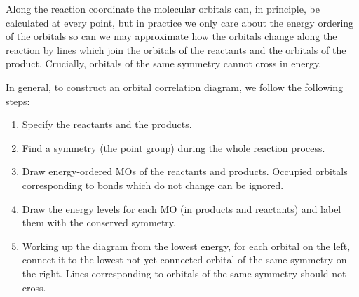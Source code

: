 \documentclass{article}
\theoremstyle{plain}\theoremheaderfont{\normalfont\itshape}\theorembodyfont{\rmfamily}\theoremseparator{.}\newtheorem*{rem}{Remark}\newtheorem*{ex}{Example}\newtheorem*{proof}{Proof}\newtheorem*{altp}{Alternative proof}
\theoremstyle{plain}\theoremheaderfont{\normalfont\bfseries}\theorembodyfont{\rmfamily}\theoremseparator{.}\newtheorem{thm}{Theorem}[section]\newtheorem{lem}[thm]{Lemma}\newtheorem{prop}[thm]{Proposition}\newtheorem*{cor}{Corollary}\newtheorem{defn}[thm]{Definition}\newtheorem{clm}[thm]{Claim}\newtheorem{clminproof}{Claim}\newtheorem{pos}{Postulate}[section]
\theoremstyle{break}\theoremheaderfont{\normalfont\itshape}\theorembodyfont{\rmfamily}\theoremseparator{.\medskip}\newtheorem*{proofskip}{Proof}\newtheorem*{exs}{Examples}\newtheorem*{rems}{Remarks}
\theoremstyle{break}\theoremheaderfont{\normalfont\bfseries}\theorembodyfont{\rmfamily}\theoremseparator{.\medskip}\newtheorem{lemskip}[thm]{Lemma}\newtheorem{defnskip}[thm]{Definition}\newtheorem{propskip}[thm]{Proposition}\newtheorem{thmskip}[thm]{Theorem}
\numberwithin{equation}{section}
\begin{document}
    Along the reaction coordinate the molecular orbitals can, in principle, be calculated at every point, but in practice we only care about the energy ordering of the orbitals so can we may approximate how the orbitals change along the reaction by lines which join the orbitals of the reactants and the orbitals of the product. Crucially, orbitals of the same symmetry cannot cross in energy.

    In general, to construct an orbital correlation diagram, we follow the following steps:
    \begin{enumerate}[topsep=0pt,label=(\roman*)]
        \item Specify the reactants and the products.
        \item Find a symmetry (the point group) during the whole reaction process.
        \item Draw energy-ordered MOs of the reactants and products. Occupied orbitals corresponding to bonds which do not change can be ignored.
        \item Draw the energy levels for each MO (in products and reactants) and label them with the conserved symmetry.
        \item Working up the diagram from the lowest energy, for each orbital on the left, connect it to the lowest not-yet-connected orbital of the same symmetry on the right. Lines corresponding to orbitals of the same symmetry should not cross.
    \end{enumerate}
\end{document}
